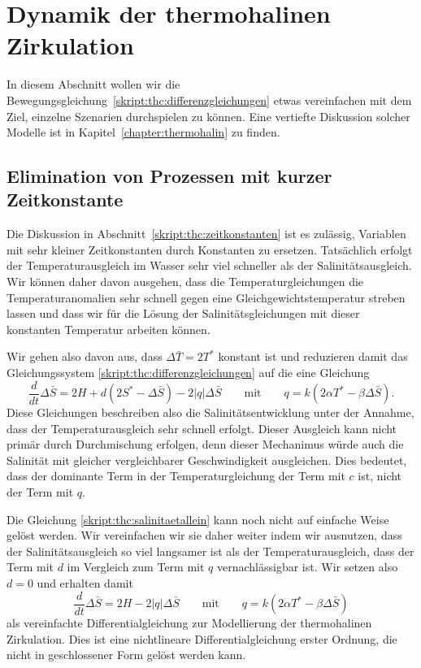 %
%
%
\section{Dynamik der thermohalinen Zirkulation}
In diesem Abschnitt wollen wir die
Bewegungsgleichung~\eqref{skript:thc:differenzgleichungen}
etwas vereinfachen mit dem Ziel, einzelne Szenarien durchspielen
zu können.
Eine vertiefte Diskussion solcher Modelle ist in
Kapitel~\ref{chapter:thermohalin} zu finden.

\subsection{Elimination von Prozessen mit kurzer Zeitkonstante}
Die Diskussion in Abschnitt~\ref{skript:thc:zeitkonstanten}
ist es zulässig, Variablen mit sehr kleiner Zeitkonstanten
durch Konstanten zu ersetzen.
Tatsächlich erfolgt der Temperaturausgleich im Wasser sehr viel
schneller als der Salinitätsausgleich.
Wir können daher davon ausgehen, dass die Temperaturgleichungen
die Temperaturanomalien sehr schnell gegen eine Gleichgewichtstemperatur
streben lassen und dass wir für die Lösung der Salinitätsgleichungen
mit dieser konstanten Temperatur arbeiten können.

Wir gehen also davon aus, dass $\Delta\bar T=2T^*$ konstant ist und
reduzieren damit das Gleichungssystem
\eqref{skript:thc:differenzgleichungen}
auf die eine Gleichung
\begin{equation}
\frac{d}{dt}\Delta\bar S
=
2H + d(2S^* -\Delta\bar S) - 2|q|\Delta\bar S
\qquad\text{mit}\qquad
q=k(2\alpha T^* -\beta \Delta\bar S).
\label{skript:thc:salinitaetallein}
\end{equation}
Diese Gleichungen beschreiben also die Salinitätsentwicklung unter
der Annahme, dass der Temperaturausgleich sehr schnell erfolgt.
Dieser Ausgleich kann nicht primär durch Durchmischung erfolgen,
denn dieser Mechanimus würde auch die Salinität mit gleicher
vergleichbarer Geschwindigkeit ausgleichen.
Dies bedeutet, dass der dominante Term in der Temperaturgleichung
der Term mit $c$ ist, nicht der Term mit $q$.

Die Gleichung \eqref{skript:thc:salinitaetallein} kann noch nicht auf
einfache Weise gelöst werden.
Wir vereinfachen wir sie daher weiter indem wir ausnutzen, dass 
der Salinitätsausgleich so viel langsamer ist als der Temperaturausgleich,
dass der Term mit $d$ im Vergleich zum Term mit $q$ vernachlässigbar ist.
Wir setzen also $d=0$ und
erhalten damit 
\begin{equation}
\frac{d}{dt}\Delta\bar S
=
2H - 2|q|\Delta\bar S
\qquad\text{mit}\qquad
q=k(2\alpha T^* -\beta \Delta\bar S)
\label{skript:thc:qgleichung}
\end{equation}
als vereinfachte Differentialgleichung zur Modellierung der 
thermohalinen Zirkulation.
Dies ist eine nichtlineare Differentialgleichung erster Ordnung,
die nicht in geschlossener Form gelöst werden kann.

